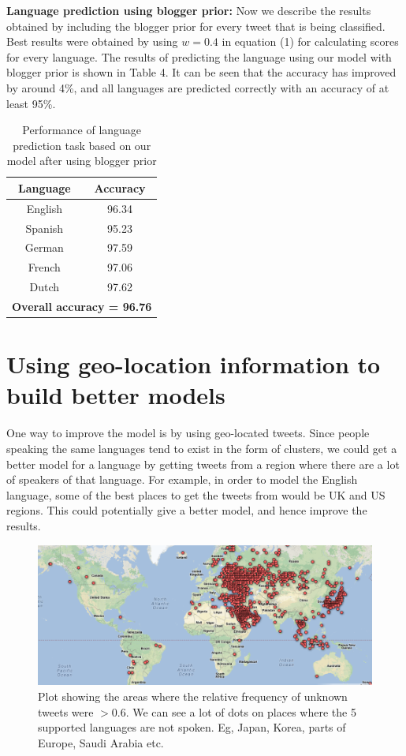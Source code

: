 \documentclass[11pt]{article}
\begin{document}
{\textbf {Language prediction using blogger prior: }} Now we describe the results obtained by including the blogger prior for every tweet that is being classified. Best results were obtained by using $w = 0.4$ in equation (1) for calculating scores for every language. The results of predicting the language using our model with blogger prior is shown in Table 4. It can be seen that the accuracy has improved by around 4\%, and all languages are predicted correctly with an accuracy of at least 95\%.

\begin{table}
\begin{center}
\small
\begin{tabular}{|c|c|}
\hline
\textbf{Language} & \textbf{Accuracy} \\
\hline
English & 96.34 \\
Spanish & 95.23 \\
German & 97.59 \\
French & 97.06 \\
Dutch & 97.62 \\ \hline
\multicolumn{2}{|c|}{\textbf{Overall accuracy = 96.76}} \\\hline
\end{tabular}
\caption{\footnotesize Performance of language prediction task based on our model after using blogger prior}
\end{center}
\end{table}

\section{Using geo-location information to build better models}
One way to improve the model is by using geo-located tweets. Since people speaking the same languages tend to exist in the form of clusters, we could get a better model for a language by getting tweets from a region where there are a lot of speakers of that language. For example, in order to model the English language, some of the best places to get the tweets from would be UK and US regions. This could potentially give a better model, and hence improve the results.

\begin{figure}[ht]
\includegraphics[scale=0.5]{unknown_plot.png}
\caption{\footnotesize Plot showing the areas where the relative frequency of unknown tweets were $> 0.6$. We can see a lot of dots on places where the 5 supported languages are not spoken. Eg, Japan, Korea, parts of Europe, Saudi Arabia etc.}
\label{fig:s4}
\end{figure}
\end{document}
